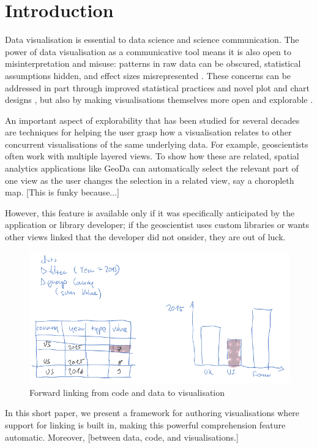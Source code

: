 \section{Introduction}

Data visualisation is essential to data science and science communication. The
power of data visualisation as a communicative tool means it is also open to
misinterpretation and misuse: patterns in raw data can be obscured, statistical
assumptions hidden, and effect sizes misrepresented \cite{weissgerber15}. These
concerns can be addressed in part through improved statistical practices and
novel plot and chart designs \cite{allen19}, but also by making visualisations
themselves more open and explorable \cite{dragicevic19}.

An important aspect of explorability that has been studied for several decades
are techniques for helping the user grasp how a visualisation relates to other
concurrent visualisations of the same underlying data. For example,
geoscientists often work with multiple layered views. To show how these are
related, spatial analytics applications like GeoDa \cite{anselin06} can
automatically select the relevant part of one view as the user changes the
selection in a related view, say a choropleth map. [This is funky because...]

However, this feature is available only if it was specifically anticipated by
the application or library developer; if the geoscientist uses custom libraries
or wants other views linked that the developer did not onsider, they are out of
luck.

\begin{figure}[H]
\includegraphics[scale=0.35]{image/chart-fwd}
\caption{Forward linking from code and data to visualisation}
\end{figure}

In this short paper, we present a framework for authoring visualisations where
support for linking is built in, making this powerful comprehension feature
automatic. Moreover, [between data, code, and visualisations.]


